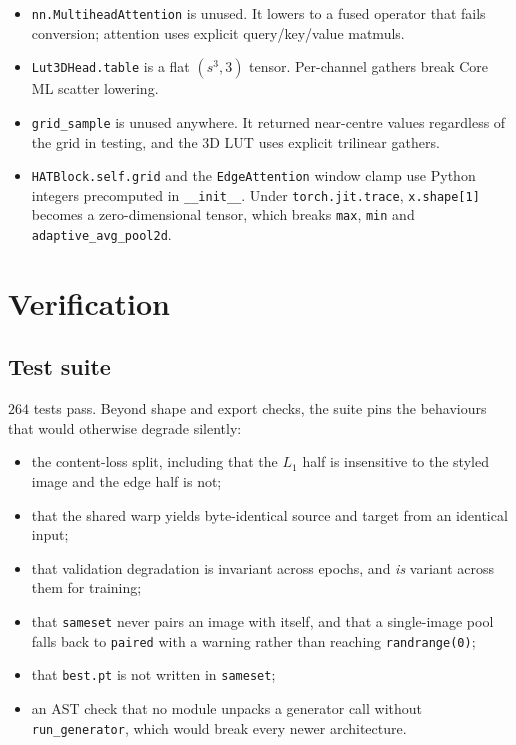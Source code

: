 \documentclass[11pt,a4paper]{article}
\newcommand{\code}[1]{\texttt{#1}}
\begin{document}
\begin{itemize}[leftmargin=1.4em]
  \item \code{nn.MultiheadAttention} is unused. It lowers to a fused operator
        that fails conversion; attention uses explicit query/key/value matmuls.
  \item \code{Lut3DHead.table} is a flat $(s^3, 3)$ tensor. Per-channel gathers
        break Core ML scatter lowering.
  \item \code{grid\_sample} is unused anywhere. It returned near-centre values
        regardless of the grid in testing, and the 3D LUT uses explicit trilinear
        gathers.
  \item \code{HATBlock.self.grid} and the \code{EdgeAttention} window clamp use
        Python integers precomputed in \code{\_\_init\_\_}. Under
        \code{torch.jit.trace}, \code{x.shape[1]} becomes a zero-dimensional
        tensor, which breaks \code{max}, \code{min} and
        \code{adaptive\_avg\_pool2d}.
\end{itemize}

\section{Verification}
\label{sec:reproduce}

\subsection{Test suite}

$264$ tests pass. Beyond shape and export checks, the suite pins the
behaviours that would otherwise degrade silently:

\begin{itemize}[leftmargin=1.4em]
  \item the content-loss split, including that the $L_1$ half is insensitive to
        the styled image and the edge half is not;
  \item that the shared warp yields byte-identical source and target from an
        identical input;
  \item that validation degradation is invariant across epochs, and \emph{is}
        variant across them for training;
  \item that \code{sameset} never pairs an image with itself, and that a
        single-image pool falls back to \code{paired} with a warning rather than
        reaching \code{randrange(0)};
  \item that \code{best.pt} is not written in \code{sameset};
  \item an AST check that no module unpacks a generator call without
        \code{run\_generator}, which would break every newer architecture.
\end{itemize}
\end{document}
